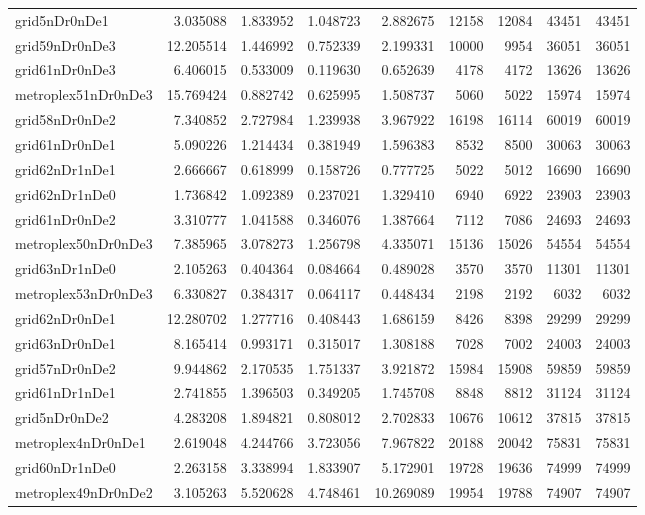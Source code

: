 \begin{longtable}{|l|r|r|r|r|r|r|r|r|}
grid5nDr0nDe1 & 3.035088 & 1.833952 & 1.048723 & 2.882675 & 12158 & 12084 & 43451 & 43451 \\
grid59nDr0nDe3 & 12.205514 & 1.446992 & 0.752339 & 2.199331 & 10000 & 9954 & 36051 & 36051 \\
grid61nDr0nDe3 & 6.406015 & 0.533009 & 0.119630 & 0.652639 & 4178 & 4172 & 13626 & 13626 \\
metroplex51nDr0nDe3 & 15.769424 & 0.882742 & 0.625995 & 1.508737 & 5060 & 5022 & 15974 & 15974 \\
grid58nDr0nDe2 & 7.340852 & 2.727984 & 1.239938 & 3.967922 & 16198 & 16114 & 60019 & 60019 \\
grid61nDr0nDe1 & 5.090226 & 1.214434 & 0.381949 & 1.596383 & 8532 & 8500 & 30063 & 30063 \\
grid62nDr1nDe1 & 2.666667 & 0.618999 & 0.158726 & 0.777725 & 5022 & 5012 & 16690 & 16690 \\
grid62nDr1nDe0 & 1.736842 & 1.092389 & 0.237021 & 1.329410 & 6940 & 6922 & 23903 & 23903 \\
grid61nDr0nDe2 & 3.310777 & 1.041588 & 0.346076 & 1.387664 & 7112 & 7086 & 24693 & 24693 \\
metroplex50nDr0nDe3 & 7.385965 & 3.078273 & 1.256798 & 4.335071 & 15136 & 15026 & 54554 & 54554 \\
grid63nDr1nDe0 & 2.105263 & 0.404364 & 0.084664 & 0.489028 & 3570 & 3570 & 11301 & 11301 \\
metroplex53nDr0nDe3 & 6.330827 & 0.384317 & 0.064117 & 0.448434 & 2198 & 2192 & 6032 & 6032 \\
grid62nDr0nDe1 & 12.280702 & 1.277716 & 0.408443 & 1.686159 & 8426 & 8398 & 29299 & 29299 \\
grid63nDr0nDe1 & 8.165414 & 0.993171 & 0.315017 & 1.308188 & 7028 & 7002 & 24003 & 24003 \\
grid57nDr0nDe2 & 9.944862 & 2.170535 & 1.751337 & 3.921872 & 15984 & 15908 & 59859 & 59859 \\
grid61nDr1nDe1 & 2.741855 & 1.396503 & 0.349205 & 1.745708 & 8848 & 8812 & 31124 & 31124 \\
grid5nDr0nDe2 & 4.283208 & 1.894821 & 0.808012 & 2.702833 & 10676 & 10612 & 37815 & 37815 \\
metroplex4nDr0nDe1 & 2.619048 & 4.244766 & 3.723056 & 7.967822 & 20188 & 20042 & 75831 & 75831 \\
grid60nDr1nDe0 & 2.263158 & 3.338994 & 1.833907 & 5.172901 & 19728 & 19636 & 74999 & 74999 \\
metroplex49nDr0nDe2 & 3.105263 & 5.520628 & 4.748461 & 10.269089 & 19954 & 19788 & 74907 & 74907 \\

\end{longtable}
